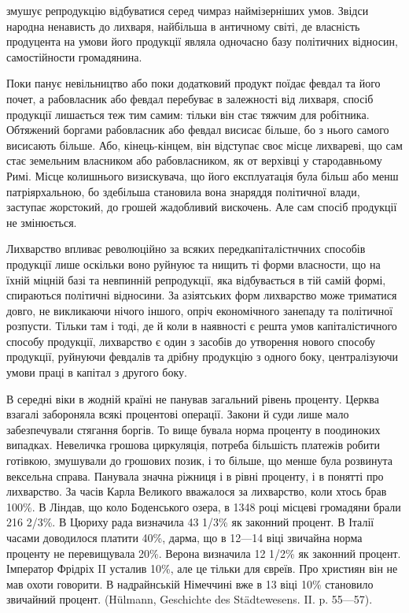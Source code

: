 змушує репродукцію відбуватися серед чимраз наймізерніших умов. Звідси народна
ненависть до лихваря, найбільша в античному світі, де власність продуцента на
умови його продукції являла одночасно базу політичних відносин, самостійности
громадянина.

Поки панує невільництво або поки додатковий продукт поїдає февдал та
його почет, а рабовласник або февдал перебуває в залежності від лихваря,
спосіб продукції лишається теж тим самим: тільки він стає тяжчим для робітника.
Обтяжений боргами рабовласник або февдал висисає більше, бо з нього
самого висисають більше. Або, кінець-кінцем, він відступає своє місце лихвареві,
що сам стає земельним власником або рабовласником, як от верхівці
у стародавньому Римі. Місце колишнього визискувача, що його експлуатація
була більш або менш патріярхальною, бо здебільша становила вона знаряддя
політичної влади, заступає жорстокий, до грошей жадобливий вискочень. Але сам
спосіб продукції не змінюється.

Лихварство впливає революційно за всяких передкапіталістнчних способів
продукції лише оскільки воно руйнуює та нищить ті форми власности, що
на їхній міцній базі та невпинній репродукції, яка відбувається в тій самій
формі, спираються політичні відносини. За азіятських форм лихварство може
триматися довго, не викликаючи нічого іншого, опріч економічного занепаду та
політичної розпусти. Тільки там і тоді, де й коли в наявності є решта умов капіталістичного
способу продукції, лихварство є один з засобів до утворення
нового способу продукції, руйнуючи февдалів та дрібну продукцію з одного боку,
централізуючи умови праці в капітал з другого боку.

В середні віки в жодній країні не панував загальний рівень проценту.
Церква взагалі забороняла всякі процентові операції. Закони й суди лише мало
забезпечували стягання боргів. То вище бувала норма проценту в поодиноких
випадках. Невеличка грошова циркуляція, потреба більшість платежів робити
готівкою, змушували до грошових позик, і то більше, що менше була розвинута
вексельна справа. Панувала значна ріжниця і в рівні проценту, і в понятті про
лихварство. За часів Карла Великого вважалося за лихварство, коли хтось брав
100\%. В Ліндав, що коло Боденського озера, в 1348 році місцеві громадяни брали
216 2/3\%. В Цюриху рада визначила 43 1/3\% як законний процент. В Італії часами
доводилося платити 40\%, дарма, що в 12—14 віці звичайна норма проценту
не перевищувала 20\%. Верона визначила 12 1/2\% як законний процент. Імператор
Фрідріх II усталив 10\%, але це тільки для євреїв. Про християн він
не мав охоти говорити. В надрайнській Німеччині вже в 13 віці 10\% становило
звичайний процент. (Hülmann, Geschichte des Städtewesens. II. p. 55—57).

